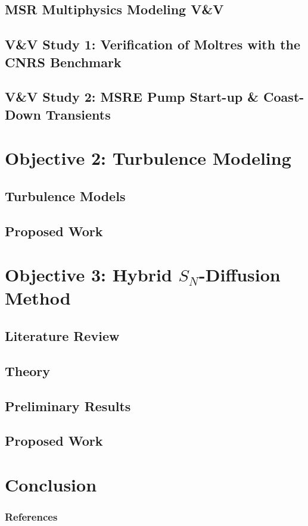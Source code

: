 \documentclass[9pt]{beamer}
\begin{document}
\subsection{MSR Multiphysics Modeling V\&V}

\subsection{V\&V Study 1: Verification of Moltres with the CNRS Benchmark}

\subsection{V\&V Study 2: MSRE Pump Start-up \& Coast-Down Transients}


\section{Objective 2: Turbulence Modeling}
\subsection{Turbulence Models}

\subsection{Proposed Work}


\section{Objective 3: Hybrid $S_N$-Diffusion Method}
\subsection{Literature Review}

\subsection{Theory}

\subsection{Preliminary Results}

\subsection{Proposed Work}


\section{Conclusion}

\begin{frame}[allowframebreaks]
  \frametitle{References}
  
  {\tiny  }

\end{frame}

\end{document}
